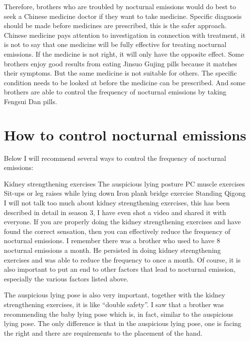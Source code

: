 \documentclass[
]{book}
\begin{document}
Therefore, brothers who are troubled by nocturnal emissions would do best to seek a Chinese medicine doctor if they want to take medicine. Specific diagnosis should be made before medicines are prescribed, this is the safer approach. Chinese medicine pays attention to investigation in connection with treatment, it is not to say that one medicine will be fully effective for treating nocturnal emissions. If the medicine is not right, it will only have the opposite effect. Some brothers enjoy good results from eating Jinsuo Gujing pills because it matches their symptoms. But the same medicine is not suitable for others. The specific condition needs to be looked at before the medicine can be prescribed. And some brothers are able to control the frequency of nocturnal emissions by taking Fengsui Dan pills.

\hypertarget{how-to-control-nocturnal-emissions}{%
\section{How to control nocturnal emissions}\label{how-to-control-nocturnal-emissions}}

Below I will recommend several ways to control the frequency of nocturnal emissions:

Kidney strengthening exercises
The auspicious lying posture
PC muscle exercises
Sit-ups or leg raises while lying down
Iron plank bridge exercise
Standing Qigong
I will not talk too much about kidney strengthening exercises, this has been described in detail in season 3, I have even shot a video and shared it with everyone. If you are properly doing the kidney strengthening exercises and have found the correct sensation, then you can effectively reduce the frequency of nocturnal emissions. I remember there was a brother who used to have 8 nocturnal emissions a month. He persisted in doing kidney strengthening exercises and was able to reduce the frequency to once a month. Of course, it is also important to put an end to other factors that lead to nocturnal emission, especially the various factors listed above.

The auspicious lying pose is also very important, together with the kidney strengthening exercises, it is like ``double safety''. I saw that a brother was recommending the baby lying pose which is, in fact, similar to the auspicious lying pose. The only difference is that in the auspicious lying pose, one is facing the right and there are requirements to the placement of the hand.
\end{document}
